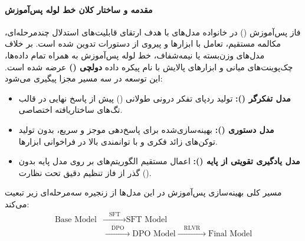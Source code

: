 \item {}

\paragraph*{مقدمه و ساختار کلان خط لوله پس‌آموزش}
فاز پس‌آموزش () در خانواده مدل‌های  با هدف ارتقای قابلیت‌های استدلال چندمرحله‌ای، مکالمه مستقیم، تعامل با ابزارها و پیروی از دستورات تدوین شده است. بر خلاف مدل‌های وزن‌بسته یا نیمه‌شفاف، خط لوله پس‌آموزش  به همراه تمام داده‌ها، چک‌پوینت‌های میانی و ابزارهای پالایش با نام پیکره داده \textbf{دولچی ()} عرضه شده است. این توسعه در سه مسیر مجزا پیگیری می‌شود:
\begin{itemize}
    \item \textbf{مدل تفکرگر ():} تولید ردپای تفکر درونی طولانی () پیش از پاسخ نهایی در قالب تگ‌های ساختاریافته اختصاصی.
    \item \textbf{مدل دستوری ():} بهینه‌سازی‌شده برای پاسخ‌دهی موجز و سریع، بدون تولید توکن‌های زائد فکری و با توانمندی بالا در فراخوانی ابزارها.
    \item \textbf{مدل یادگیری تقویتی از پایه ():} اعمال مستقیم الگوریتم‌های  بر روی مدل پایه بدون گذر از فاز تنظیم دقیق تحت نظارت ().
\end{itemize}

مسیر کلی بهینه‌سازی پس‌آموزش در این مدل‌ها از زنجیره سه‌مرحله‌ای زیر تبعیت می‌کند:
\begin{equation}
\begin{aligned}
    \text{Base Model} &\xrightarrow{\quad\text{SFT}\quad} \text{SFT Model} \\
    &\xrightarrow{\quad\text{DPO}\quad} \text{DPO Model} \xrightarrow{\quad\text{RLVR}\quad} \text{Final Model}
\end{aligned}
\end{equation}

